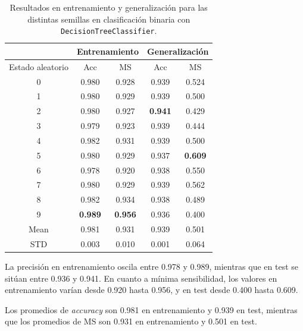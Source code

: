 \begin{table}[H]
	\centering
	\begin{tabular}{ |c|c|c|c|c| }
		\hline
		\rowcolor{LightCyan}
		 & \multicolumn{2}{c|}{Entrenamiento} & \multicolumn{2}{c|}{Generalización} \\
		\hline
		\rowcolor{LightCyan}
		 Estado aleatorio & Acc & MS & Acc & MS \\
		\hline
		0    & 0.980          & 0.928          & 0.939          & 0.524          \\
		1    & 0.980          & 0.929          & 0.939          & 0.500          \\
		2    & 0.980          & 0.927          & \textbf{0.941} & 0.429          \\
		3    & 0.979          & 0.923          & 0.939          & 0.444          \\
		4    & 0.982          & 0.931          & 0.939          & 0.500          \\
		5    & 0.980          & 0.929          & 0.937          & \textbf{0.609} \\
		6    & 0.978          & 0.920          & 0.938          & 0.550          \\
		7    & 0.980          & 0.929          & 0.939          & 0.562          \\
		8    & 0.982          & 0.934          & 0.938          & 0.489          \\
		9    & \textbf{0.989} & \textbf{0.956} & 0.936          & 0.400          \\
		Mean & 0.981          & 0.931          & 0.939          & 0.501          \\
		STD  & 0.003          & 0.010          & 0.001          & 0.064          \\
		\hline
	\end{tabular}
	\caption{Resultados en entrenamiento y generalización para las distintas semillas en clasificación binaria con  \texttt{DecisionTreeClassifier}.}
	\label{tabla:dt_multi}
\end{table}

La precisión en entrenamiento oscila entre 0.978 y 0.989, mientras que en test se sitúan entre 0.936 y 0.941. En cuanto a mínima sensibilidad, los valores en entrenamiento varían desde 0.920 hasta 0.956, y en test desde 0.400 hasta 0.609.

\vspace{1em}

Los promedios de \textit{accuracy} son 0.981 en entrenamiento y 0.939 en test, mientras que los promedios de MS son 0.931 en entrenamiento y 0.501 en test.

